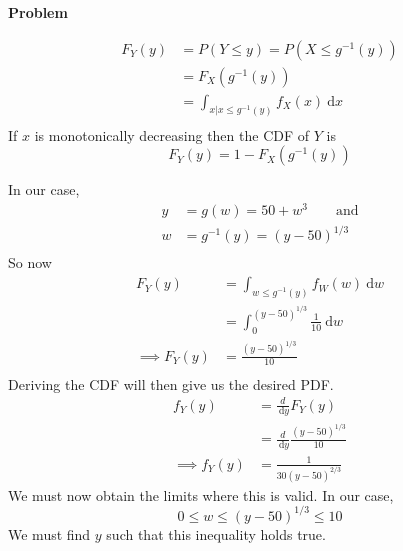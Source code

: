 \documentclass[12pt]{article}
\newenvironment{Ex}{\textbf{Problem}\vspace{.75em}\\}{}
\newcommand{\dd}[1]{\:\mathrm{d}{#1}}
\begin{document}
\begin{enumerate}
\begin{Ex}
\begin{solution}
\begin{enumerate}
\begin{mdframed}[backgroundcolor=silver]
\begin{description}
\begin{equation*}
              \begin{aligned}
                F_Y(y) &= P(Y\le y) = P(X \le g^{-1}(y)) \\
                &= F_X(g^{-1}(y)) \\
                &= \int_{x|x\le g^{-1}(y)} f_X(x) \dd{x} \\
              \end{aligned}
            \end{equation*}
            If $x$ is monotonically decreasing then the CDF of $Y$ is
            $$F_Y(y) = 1 - F_X(g^{-1}(y))$$
          \end{description}
        \end{mdframed}
        In our case,
        \begin{equation}
          \label{eq:4b-setup}
          \begin{aligned}
            y &= g(w) = 50 + w^3  \quad\quad\text{and} \\
            w &= g^{-1}(y) = (y-50)^{1/3} \\
          \end{aligned}
        \end{equation}
        So now
        \begin{equation}
          \label{eq:4b-cdf}
          \begin{aligned}
            F_Y(y) &= \int_{w\le g^{-1}(y)} f_W(w) \dd{w} \\
            &= \int_{0}^{(y-50)^{1/3}} \frac{1}{10} \dd{w} \\
            \implies F_Y(y) &= \frac{(y-50)^{1/3}}{10} \\
          \end{aligned}
        \end{equation}
        Deriving the CDF will then give us the desired PDF.
        \begin{equation}
          \label{eq:4b-pdf}
          \begin{aligned}
            f_Y(y) &= \frac{d}{\dd{y}} F_Y(y) \\
            &= \frac{d}{\dd{y}} \frac{(y-50)^{1/3}}{10} \\
            \implies f_Y(y) &= \frac{1}{30 (y-50)^{2/3}}
          \end{aligned}
        \end{equation}
        We must now obtain the limits where this is valid. In our
        case,
        $$0\le w \le (y-50)^{1/3} \le 10$$
        We must find $y$ such that this inequality holds true.
        \begin{table}[H]

\end{table}
\end{enumerate}
\end{solution}
\end{Ex}
\end{enumerate}
\end{document}
